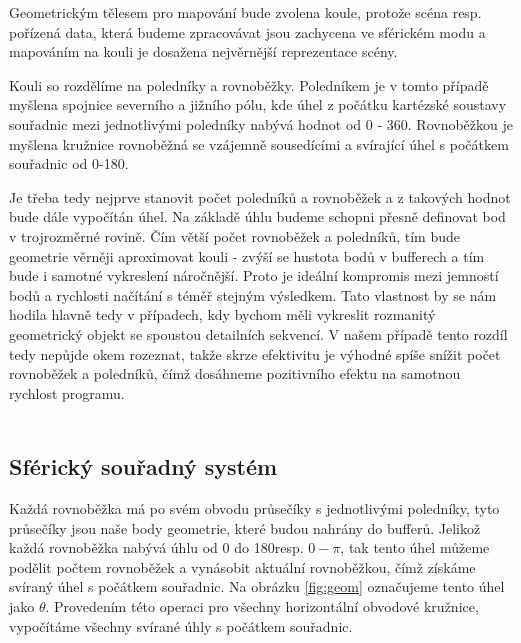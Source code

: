 Geometrickým tělesem pro mapování bude zvolena koule, protože scéna resp. pořízená data, která budeme zpracovávat jsou zachycena ve sférickém modu a mapováním na kouli je dosažena nejvěrnější reprezentace scény.

Kouli so rozdělíme na poledníky a rovnoběžky. Poledníkem je v tomto případě myšlena spojnice severního a jižního pólu, kde úhel z počátku kartézské soustavy souřadnic mezi jednotlivými poledníky nabývá hodnot od 0 - 360\degree. Rovnoběžkou je myšlena kružnice  rovnoběžná se vzájemně sousedícími a svírající úhel s počátkem souřadnic od 0-180\degree. 

Je třeba tedy nejprve stanovit počet poledníků a rovnoběžek a z takových hodnot bude dále vypočítán úhel. Na základě úhlu budeme schopni přesně definovat bod v trojrozměrné rovině. Čím větší počet rovnoběžek a poledníků, tím bude geometrie věrněji aproximovat kouli - zvýší se hustota bodů v bufferech a tím bude i samotné vykreslení náročnější. Proto je ideální kompromis mezi jemností bodů a rychlosti načítání s téměř stejným výsledkem. Tato vlastnost by se nám hodila hlavně tedy v případech, kdy bychom měli vykreslit rozmanitý geometrický objekt se spoustou detailních sekvencí. V našem případě tento rozdíl tedy nepůjde okem rozeznat, takže skrze efektivitu je výhodné spíše snížit počet rovnoběžek a poledníků, čímž dosáhneme pozitivního efektu na samotnou rychlost programu.
\\\\

\subsection{Sférický souřadný systém}

Každá rovnoběžka má po svém obvodu průsečíky s jednotlivými poledníky, tyto průsečíky jsou naše body geometrie, které budou nahrány do bufferů. Jelikož každá rovnoběžka nabývá úhlu od 0 do 180\degree  resp. $0-\pi$, tak tento úhel můžeme podělit počtem rovnoběžek a vynásobit aktuální rovnoběžkou, čímž získáme svíraný úhel s počátkem souřadnic. Na obrázku \ref{fig:geom} označujeme tento úhel jako $\theta$. Provedením této operaci pro všechny horizontální obvodové kružnice, vypočítáme všechny svírané úhly s počátkem souřadnic. 

